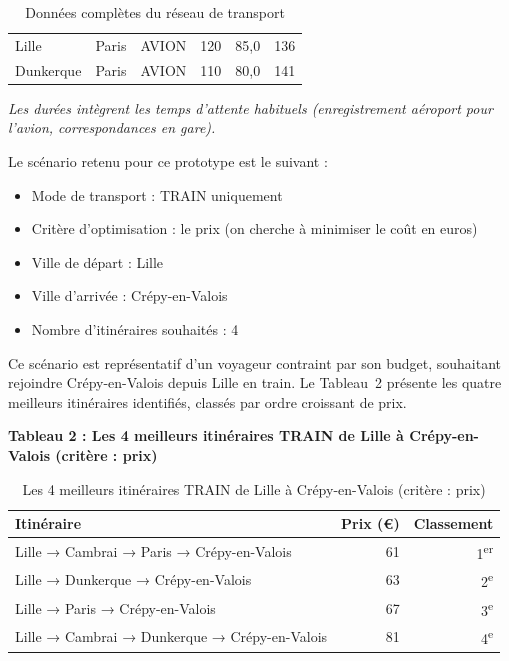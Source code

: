 \documentclass[fontsize=10pt,oneside,parskip=half]{scrreprt}
\begin{document}
\begin{table}[H]
\begin{tabular}{lllrrr}
    Lille             & Paris             & AVION  & 120 & 85{,}0 & 136 \\ %
    Dunkerque         & Paris             & AVION  & 110 & 80{,}0 & 141 \\ %

    \bottomrule
  \end{tabular}
  \caption{Données complètes du réseau de transport}
\end{table}

{\small\itshape Les durées intègrent les temps d'attente habituels
(enregistrement aéroport pour l'avion, correspondances en gare).}

\newpage
Le scénario retenu pour ce prototype est le suivant :

\begin{itemize}
  \item Mode de transport : TRAIN uniquement
  \item Critère d'optimisation : le prix (on cherche à minimiser le coût en euros)
  \item Ville de départ : Lille
  \item Ville d'arrivée : Crépy-en-Valois
  \item Nombre d'itinéraires souhaités : 4
\end{itemize}

Ce scénario est représentatif d'un voyageur contraint par son budget, souhaitant
rejoindre Crépy-en-Valois depuis Lille en train. Le Tableau~2 présente les quatre
meilleurs itinéraires identifiés, classés par ordre croissant de prix.

\noindent\textbf{Tableau 2 : Les 4 meilleurs itinéraires TRAIN de Lille à
Crépy-en-Valois (critère : prix)}

\begin{table}[H]
  \centering
  \begin{tabularx}{\textwidth}{Xrr}
    \toprule
    \textbf{Itinéraire} & \textbf{Prix (€)} & \textbf{Classement} \\
    \midrule
    Lille → Cambrai → Paris → Crépy-en-Valois      & 61 & 1\textsuperscript{er} \\
    Lille → Dunkerque → Crépy-en-Valois            & 63 & 2\textsuperscript{e}  \\
    Lille → Paris → Crépy-en-Valois                & 67 & 3\textsuperscript{e}  \\
    Lille → Cambrai → Dunkerque → Crépy-en-Valois  & 81 & 4\textsuperscript{e}  \\
    \bottomrule
  \end{tabularx}
  \caption{Les 4 meilleurs itinéraires TRAIN de Lille à Crépy-en-Valois (critère : prix)}
\end{table}
\end{document}
